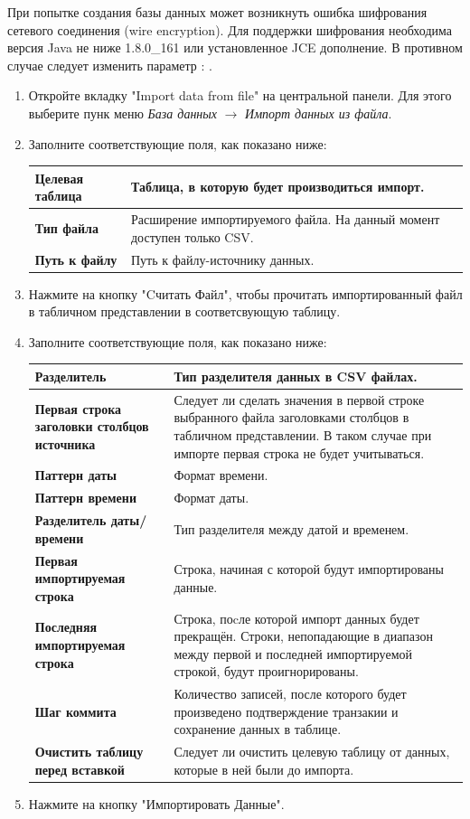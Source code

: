 \begin{redremark}
При попытке создания базы данных может возникнуть ошибка шифрования сетевого соединения (wire encryption). Для поддержки шифрования необходима версия Java не ниже 1.8.0\_161 или установленное JCE дополнение. В противном случае следует изменить параметр : .
\end{redremark}


\begin{enumerate}
	\item Откройте вкладку "Import data from file" на центральной панели. Для этого выберите пунк меню \textit{База данных} $\rightarrow$ \textit{Импорт данных из файла}.
	\item Заполните соответствующие поля, как показано ниже:
	\begin{longtable}[r]{|>{\bfseries}m{3.9cm}|m{11cm}|}
		\hline
		Целевая таблица & Таблица, в которую будет производиться импорт.\\\hline
		Тип файла & Расширение импортируемого файла. На данный момент доступен только CSV.\\\hline
		Путь к файлу & Путь к файлу-источнику данных.\\\hline
	\end{longtable}
	\item Нажмите на кнопку "Cчитать Файл", чтобы прочитать импортированный файл в табличном представлении в соответсвующую таблицу.
	\item Заполните соответствующие поля, как показано ниже:
	\begin{longtable}[r]{|>{\bfseries}m{3.9cm}|m{11cm}|}
		\hline
		Разделитель & Тип разделителя данных в CSV файлах.\\\hline
		Первая строка заголовки столбцов источника & Следует ли сделать значения в первой строке выбранного файла заголовками столбцов в табличном представлении. В таком случае при импорте первая строка не будет учитываться.\\\hline
		Паттерн даты & Формат времени.\\\hline
		Паттерн времени & Формат даты.\\\hline
		Разделитель даты/времени & Тип разделителя между датой и временем.\\\hline
		Первая импортируемая строка & Строка, начиная с которой будут импортированы данные.\\\hline
		Последняя импортируемая строка & Строка, поcле которой импорт данных будет прекращён. Строки, непопадающие в диапазон между первой и последней импортируемой строкой, будут проигнорированы.\\\hline
		Шаг коммита & Количество записей, после которого будет произведено подтверждение транзакии и сохранение данных в таблице.\\\hline
		Очистить таблицу перед вставкой & Следует ли очистить целевую таблицу от данных, которые в ней были до импорта.\\\hline
	\end{longtable}
	\item Нажмите на кнопку "Импортировать Данные".
\end{enumerate}

